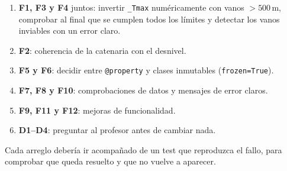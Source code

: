 \documentclass[11pt,a4paper]{article}
\newcommand{\code}[1]{\texttt{#1}}
\begin{document}
\begin{enumerate}[leftmargin=1.5em]
  \item \textbf{F1, F3 y F4} juntos: invertir \code{\_Tmax} numéricamente con vanos $>500$\,m, comprobar al final que se cumplen todos los límites y detectar los vanos inviables con un error claro.
  \item \textbf{F2}: coherencia de la catenaria con el desnivel.
  \item \textbf{F5 y F6}: decidir entre \code{@property} y clases inmutables (\code{frozen=True}).
  \item \textbf{F7, F8 y F10}: comprobaciones de datos y mensajes de error claros.
  \item \textbf{F9, F11 y F12}: mejoras de funcionalidad.
  \item \textbf{D1--D4}: preguntar al profesor antes de cambiar nada.
\end{enumerate}

Cada arreglo debería ir acompañado de un test que reproduzca el fallo, para comprobar que queda resuelto y que no vuelve a aparecer.
\end{document}
